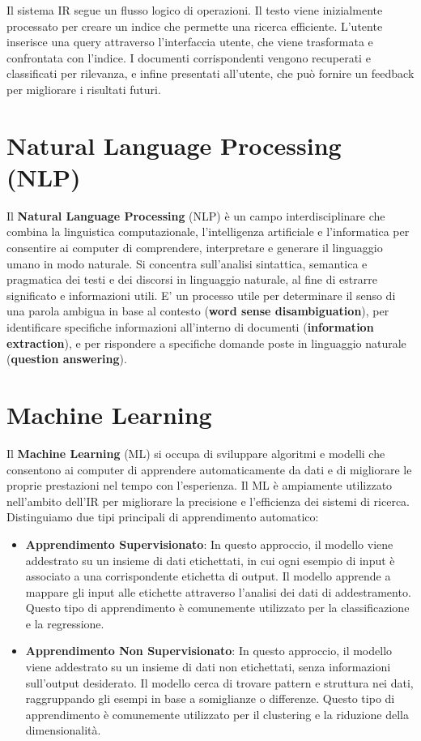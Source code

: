 \documentclass{report}
\begin{document}
	Il sistema IR segue un flusso logico di operazioni. Il testo viene inizialmente processato per creare un indice che permette una ricerca efficiente. L'utente inserisce una query attraverso l'interfaccia utente, che viene trasformata e confrontata con l'indice. I documenti corrispondenti vengono recuperati e classificati per rilevanza, e infine presentati all'utente, che può fornire un feedback per migliorare i risultati futuri.

	\section{Natural Language Processing (NLP)}
	Il \textbf{Natural Language Processing} (NLP) è un campo interdisciplinare che combina la linguistica computazionale, l'intelligenza artificiale e l'informatica per consentire ai computer di comprendere, interpretare e generare il linguaggio umano in modo naturale. Si concentra sull'analisi sintattica, semantica e pragmatica dei testi e dei discorsi in linguaggio naturale, al fine di estrarre significato e informazioni utili. E' un processo utile per determinare il senso di una parola ambigua in base al contesto (\textbf{word sense disambiguation}), per identificare specifiche informazioni all'interno di documenti (\textbf{information extraction}), e per rispondere a specifiche domande poste in linguaggio naturale (\textbf{question answering}).
	
	\section{Machine Learning}
	Il \textbf{Machine Learning} (ML) si occupa di sviluppare algoritmi e modelli che consentono ai computer di apprendere automaticamente da dati e di migliorare le proprie prestazioni nel tempo con l'esperienza. Il ML è ampiamente utilizzato nell'ambito dell'IR per migliorare la precisione e l'efficienza dei sistemi di ricerca. Distinguiamo due tipi principali di apprendimento automatico:
	\begin{itemize}
		\item \textbf{Apprendimento Supervisionato}: In questo approccio, il modello viene addestrato su un insieme di dati etichettati, in cui ogni esempio di input è associato a una corrispondente etichetta di output. Il modello apprende a mappare gli input alle etichette attraverso l'analisi dei dati di addestramento. Questo tipo di apprendimento è comunemente utilizzato per la classificazione e la regressione.
		\item \textbf{Apprendimento Non Supervisionato}: In questo approccio, il modello viene addestrato su un insieme di dati non etichettati, senza informazioni sull'output desiderato. Il modello cerca di trovare pattern e struttura nei dati, raggruppando gli esempi in base a somiglianze o differenze. Questo tipo di apprendimento è comunemente utilizzato per il clustering e la riduzione della dimensionalità.
	\end{itemize}
\end{document}
